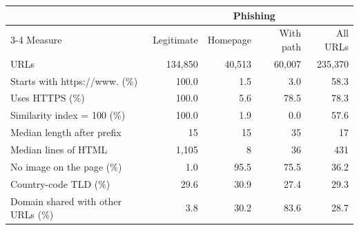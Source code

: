 \begin{tabular}{lrrrr}
\toprule
 & & \multicolumn{2}{c}{Phishing} & \\
\cmidrule(lr){3-4}
Measure & Legitimate & Homepage & With path & All URLs \\
\midrule
URLs & 134,850 & 40,513 & 60,007 & 235,370 \\
Starts with https://www. (\%) & 100.0 & 1.5 & 3.0 & 58.3 \\
Uses HTTPS (\%) & 100.0 & 5.6 & 78.5 & 78.3 \\
Similarity index = 100 (\%) & 100.0 & 1.9 & 0.0 & 57.6 \\
Median length after prefix & 15 & 15 & 35 & 17 \\
Median lines of HTML & 1,105 & 8 & 36 & 431 \\
No image on the page (\%) & 1.0 & 95.5 & 75.5 & 36.2 \\
Country-code TLD (\%) & 29.6 & 30.9 & 27.4 & 29.3 \\
Domain shared with other URLs (\%) & 3.8 & 30.2 & 83.6 & 28.7 \\
\bottomrule
\end{tabular}
